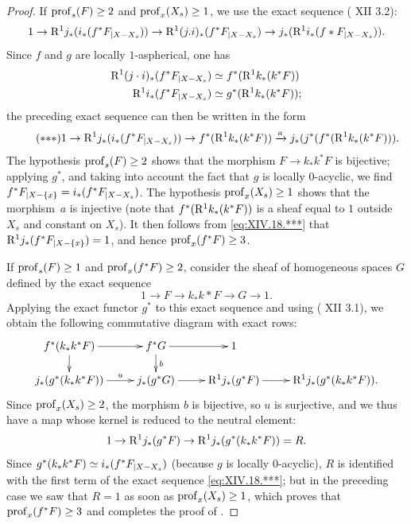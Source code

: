 \begin{proof}
If $\prof_s(F)\geq 2$ and $\prof_x(X_s)\geq 1$, we use the exact sequence ( XII 3.2):
$$1\to\R^1j_*(i_*(f^*\sisi{F{|X-X_s}}{F_{|X-X_s}}))\to\R^1(j.i)_*(f^*\sisi{F{|X-X_s}}{F_{|X-X_s}}) \to j_*(\R^1i_*(f*\sisi{F{|X-X_s}}{F_{|X-X_s}})).
$$
Since $f$ and $g$ are locally $1$-aspherical, one has
\begin{align*}
\R^1(j\cdot i)_*(f^*\sisi{F{|X-X_s}}{F_{|X-X_s}})&\simeq f^*(\R^1k_*(k^*F)) \\
\R^1i_*(f^*\sisi{F{|X-X_s}}{F_{|X-X_s}})&\simeq g^*(\R^1k_*(k^*F));
\end{align*}
the preceding exact sequence can then be written in the form
\enlargethispage{\baselineskip}%
\begin{equation} \label{eq:XIV.18.***}\tag{${*}{*}{*}$}
1\to\R^1j_*(i_*(f^*\sisi{F{|X-X_s}}{F_{|X-X_s}}))\to f^*(\R^1k_*(k^*F))\lto{a} j_*(j^*(f^*(\R^1k_*(k^*F))).
\end{equation}
The hypothesis $\prof_s(F)\geq 2$ shows that the morphism $F\to k_*k^*F$ is bijective; applying $g^*$, and taking into account the fact that $g$ is locally $0$-acyclic, we find $f^*\sisi{F{|X-\{x\}}}{F_{|X-\{x\}}}=i_*(f^*\sisi{F{|X-X_s}}{F_{|X-X_s}})$. The hypothesis $\prof_x(X_s)\geq 1$ shows that the morphism~$a$ is injective (note that $f^*(\R^1k_*(k^*F))$ is a sheaf equal to $1$ outside $X_s$ and constant on $X_s$). It then follows from \eqref{eq:XIV.18.***} that $\R^1j_*(f^*\sisi{F{|X-\{x\}}}{F_{|X-\{x\}}})=1$, and hence $\prof_x(f^*F)\geq 3$\pageoriginale.

\enlargethispage{.8\baselineskip}%
If $\prof_s(F)\geq 1$ and $\prof_x(f^*F)\geq 2$, consider the sheaf of homogeneous spaces $G$ defined by the exact sequence
$$
1\to F\to k_*k*F\to G\to 1.
$$
Applying the exact functor $g^*$ to this exact sequence and using ( XII 3.1), we obtain the following commutative diagram with exact rows:
$$
\xymatrix@R=5mm{f^*(k_*k^*F)\ar[r]\ar[d]&f^*G\ar[r]\ar[d]^b&1\\
j_*(g^*(k_*k^*F))\sisi{\ar[r]}{\ar[r]^-{u}}&j_*(g^*G)\ar[r]&\R^1j_*(g^*F) \ar[r]&\R^1j_*(g^*(k_*k^*F)).}
$$
Since $\prof_x(X_s)\geq 2$, the morphism $b$ is bijective, so $u$ is surjective, and we thus have a map whose kernel is reduced to the neutral element:
$$
1\to\R^1j_*(g^*F)\to\R^1j_*(g^*(k_*k^*F))=R.
$$
Since $g^*(k_*k^*F)\simeq i_*(f^*\sisi{F{|X-X_s}}{F_{|X-X_s}})$ (because $g$ is locally $0$-acyclic), $R$ is identified with the first term of the exact sequence \eqref{eq:XIV.18.***}; but in the preceding case we saw that $R=1$ as soon as $\prof_x(X_s)\geq 1$, which proves that $\prof_x(f^*F)\geq 3$ and completes the proof of .
\skipqed
\end{proof}

